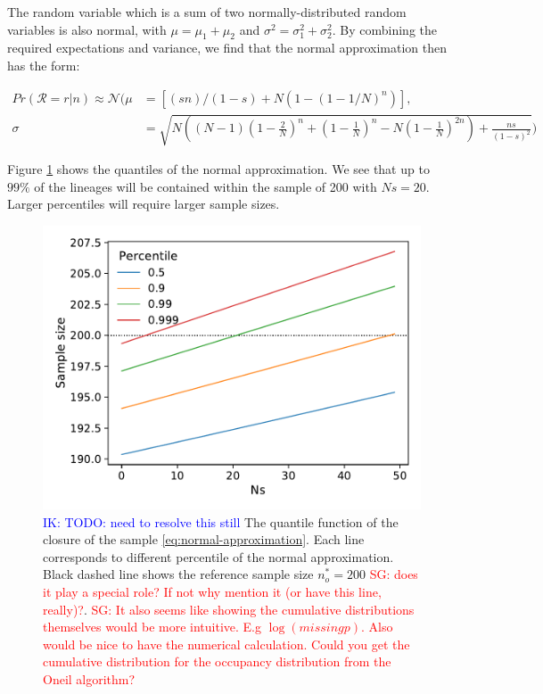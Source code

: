 \documentclass[review]{elsarticle}
\newcommand{\sgcomment}[1]{\textcolor{red}{SG: #1}}
\newcommand{\ikcomment}[1]{\textcolor{blue}{IK: #1}}
\begin{document}
The random variable which is a sum of two normally-distributed random variables is also normal, with
$\mu=\mu_1+\mu_2$ and $\sigma^2 = \sigma^2_1 + \sigma^2_2$. By combining the required expectations
and variance, we find that the normal approximation then has the form:

\begin{align}
  \label{eq:normal-approximation}
  Pr(\mathcal{R}=r|n) \approx \mathcal{N}( \mu &= \left[(s n)/(1 - s) + N (1 - (1 - 1/N)^n)\right],\\
  \sigma &= \sqrt{N \left((N-1) \left(1-\frac{2}{N}\right)^n+\left(1-\frac{1}{N}\right)^n-N\left(1-\frac{1}{N}\right)^{2 n}\right)+\frac{n s}{(1-s)^2}})
\end{align}

Figure \ref{fig:normal-approximation} shows the quantiles of the normal approximation. We see that
up to $99\%$ of the lineages will be contained within the sample of 200 with $Ns=20$. Larger
percentiles will require larger sample sizes.

\begin{figure}
  \centering
  \includegraphics[]{fig/quantile.pdf}
  \caption{\ikcomment{TODO: need to resolve this still} The quantile function of the closure of the
    sample \eqref{eq:normal-approximation}. Each line corresponds to different percentile of the
    normal approximation. Black dashed line shows the reference sample size $n_o^*=200$
    \sgcomment{does it play a special role? If not why mention it (or have this line, really)?}.
    \sgcomment{It also seems like showing the cumulative distributions themselves would be more
      intuitive. E.g $\log(missing p)$. Also would be nice to have the numerical calculation. Could
      you get the cumulative distribution for the occupancy distribution from the Oneil algorithm? }}
  \label{fig:normal-approximation}
\end{figure}
\end{document}
